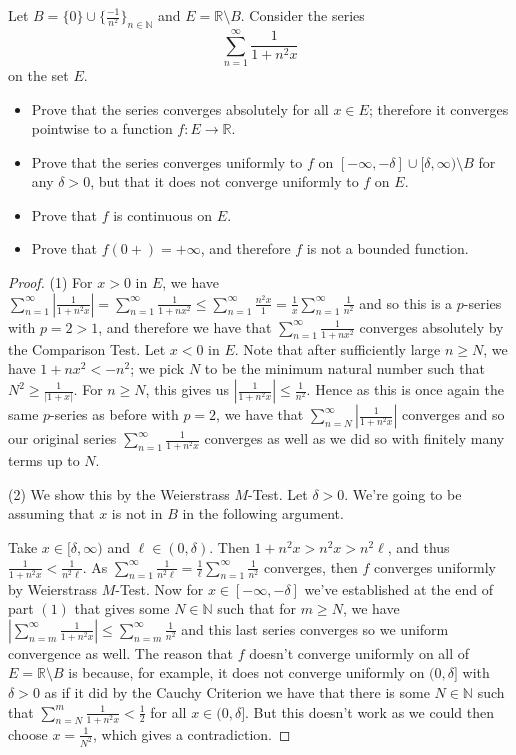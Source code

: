 \documentclass[oneside]{amsart}
\theoremstyle{definition}
\newcommand{\rr}{\mathbb R}
\newcommand{\nn}{\mathbb N}
\begin{document}
\begin{tcolorbox}[colback=black!5!white,colframe=black!75!black,title= Exercise $4.1.$] Let $B = \{ 0 \} \cup \{ \frac{-1}{n^2} \}_{n \in \nn}$ and $E = \rr \setminus B$. Consider the series 
\[
\sum_{n=1}^\infty \frac{1}{1+n^2x}
\] on the set $E$.
\begin{itemize}
	\item [(1)] Prove that the series converges absolutely for all $x \in E$; therefore it converges pointwise to a function $f \colon E \to \rr$.
	\item [(2)] Prove that the series converges uniformly to $f$ on $[-\infty , -\delta ] \cup [\delta, \infty) \setminus B$ for any $\delta > 0$, but that it does not converge uniformly to $f$ on $E$.
	\item [(3)] Prove that $f$ is continuous on $E$.
	\item [(4)] Prove that $f(0+) = +\infty$, and therefore $f$ is not a bounded function.
\end{itemize}
\tcblower 
\begin{proof} (1) For $x > 0$ in $E$, we have 
$\sum_{n=1}^\infty \left|\frac{1}{1+n^2x}\right| = \sum_{n=1}^\infty \frac{1}{1+nx^2} \leq \sum_{n=1}^\infty \frac{n^2x}{1} = \frac{1}{x} \sum_{n=1}^\infty \frac{1}{n^2}$ and so this is a $p$-series with $p=2>1$, and therefore we have that $\sum_{n=1}^\infty \frac{1}{1+nx^2}$ converges absolutely by the Comparison Test. Let $x<0$ in $E$. Note that after sufficiently large $n \geq N$, we have $1+nx^2 <-n^2$; we pick $N$ to be the minimum natural number such that $N^2 \geq \frac{1}{|1+x|}$. For $n \geq N$, this gives us $\left | \frac{1}{1+n^2x} \right | \leq \frac{1}{n^2}$. Hence as this is once again the same $p$-series as before with $p=2$, we have that $\sum_{n=N}^\infty \left | \frac{1}{1+n^2x} \right |$ converges and so our original series $\sum_{n=1}^\infty \frac{1}{1+n^2x}$ converges as well as we did so with finitely many terms up to $N$. 

(2) We show this by the Weierstrass $M$-Test. Let $\delta > 0$. We're going to be assuming that $x$ is not in $B$ in the following argument.

 Take $x \in [\delta, \infty) $ and $\ell \in (0, \delta )$. Then $1+n^2x > n^2x > n^2 \ell$, and thus $\frac{1}{1+n^2x} < \frac{1}{n^2 \ell }$. As $\sum_{n=1}^\infty \frac{1}{n^2 \ell } = \frac{1}{\ell }\sum_{n=1}^\infty \frac{1}{n^2}$ converges, then $f$ converges uniformly by Weierstrass $M$-Test. Now for $x \in [-\infty, -\delta]$ we've established at the end of part $(1)$ that gives some $N \in \nn$ such that for $m \geq N$, we have $\left | \sum_{n=m}^\infty  \frac{1}{1+n^2x} \right | \leq \sum_{n=m}^\infty \frac{1}{n^2} $ and this last series converges so we uniform convergence as well. The reason that $f$ doesn't converge uniformly on all of $E = \rr \setminus B$ is because, for example, it does not converge uniformly on $(0, \delta ]$ with $\delta > 0$ as if it did by the Cauchy Criterion we have that there is some $N \in \nn$ such that $ \sum_{n=N}^m \frac{1}{1+n^2x} < \frac{1}{2}$ for all $x \in (0, \delta]$. But this doesn't work as we could then choose $x = \frac{1}{N^2}$, which gives a contradiction. 
 

\end{proof}
\end{tcolorbox}
\end{document}
